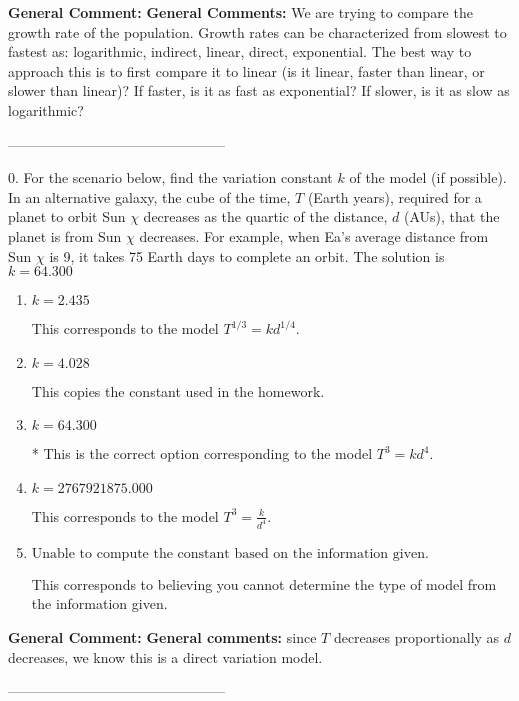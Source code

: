 \documentclass{extbook}[14pt]
\begin{document}
\textbf{General Comment:} \textbf{General Comments:} We are trying to compare the growth rate of the population. Growth rates can be characterized from slowest to fastest as: logarithmic, indirect, linear, direct, exponential. The best way to approach this is to first compare it to linear (is it linear, faster than linear, or slower than linear)? If faster, is it as fast as exponential? If slower, is it as slow as logarithmic? 

-----------------------------------------------

0. For the scenario below, find the variation constant $k$ of the model (if possible).
In an alternative galaxy, the cube of the time, $T$ (Earth years), required for a planet to orbit Sun $\chi$ decreases as the quartic of the distance, $d$ (AUs), that the planet is from Sun $\chi$ decreases. For example, when Ea's average distance from Sun $\chi$ is 9, it takes 75 Earth days to complete an orbit. 
The solution is $ k = 64.300 $ 

\begin{enumerate}[label=\Alph*.] 
\item $ k = 2.435 $ 

 This corresponds to the model $T^{1/3} = k d^{1/4}$. 
\item $ k = 4.028 $ 

 This copies the constant used in the homework. 
\item $ k = 64.300 $ 

 * This is the correct option corresponding to the model $T^{3} = k d^{4}$. 
\item $ k = 2767921875.000 $ 

 This corresponds to the model $T^{3} = \frac{k}{d^{4}}$. 
\item $ \text{Unable to compute the constant based on the information given.} $ 

 This corresponds to believing you cannot determine the type of model from the information given. 
\end{enumerate} 
 
\textbf{General Comment:} \textbf{General comments:} since $T$ decreases proportionally as $d$ decreases, we know this is a direct variation model. 

-----------------------------------------------
\end{document}
